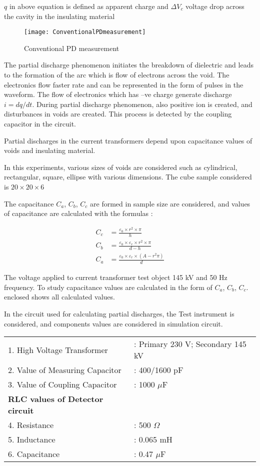 $q$ in above equation is defined as apparent charge and $\Delta V_c$ voltage drop across the cavity in the insulating material

\begin{figure}[h!]
\centering
\texttt{[image: ConventionalPDmeasurement]}
\caption{Conventional PD measurement}
\label{fig:Conventional PD measurement}
\end{figure}

The partial discharge phenomenon initiates the breakdown of dielectric and leads to the formation of the arc which is flow of electrons across the void. The electronics flow faster rate and can be represented in the form of pulses in the waveform. The flow of electronics which has –ve charge generate discharge $i = dq / dt$. During partial discharge phenomenon, also positive ion is created, and disturbances in voids are created. This process is detected by the coupling capacitor in the circuit\setlength{\parskip}{1em}.

Partial discharges in the current transformers depend upon capacitance values of voids and insulating material.
 
In this experiments, various sizes of voids are considered such as cylindrical, rectangular, square, ellipse with various dimensions. The cube sample considered is $20 \times 20 \times 6$

The capacitance $C_a$, $C_b$, $C_c$ are formed in sample size are considered, and values of capacitance are calculated with the formulas : 

\begin{align}
C_c &= \frac{\varepsilon_0 \times r^2 \times \pi}{h}\\
C_b &= \frac{\varepsilon_0 \times \varepsilon_r \times r^2 \times \pi}{d - h}\\
C_a &= \frac{\varepsilon_0 \times \varepsilon_r \times (A - r^2 \pi)}{d}
\end{align}

The voltage applied to current transformer test object 145 kV and 50 Hz frequency. To study capacitance values are calculated in the form of $C_a$, $C_b$, $C_c$. enclosed shows all calculated values. 

In the circuit used for calculating partial discharges, the Test instrument is considered, and components values are considered in simulation circuit.

\begin{tabular}{l  l}
1. High Voltage Transformer		&: Primary 230 V; Secondary 145 kV\\
2. Value of Measuring Capacitor	& : 400/1600 pF\\
3. Value of Coupling Capacitor	& : 1000 $\mu$F\\
\textbf{RLC values of Detector circuit} & {}\\
4. Resistance					& : 500 $\Omega$\\
5. Inductance	 				& : 0.065 mH\\
6. Capacitance 	 				& : 0.47 $\mu$F
\end{tabular}

